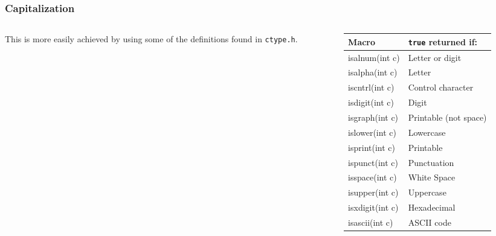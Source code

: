 \begin{frame}[fragile]
\frametitle{Capitalization}
\begin{columns}[T]
\begin{column}{0.45\textwidth}



{\footnotesize
This is more easily achieved by using some of
the definitions found in {\tt ctype.h}.
}
\end{column}


\pause
\begin{column}{0.45\textwidth}
\begin{center}
\begin{tabular}{|l|l|} \hline
Macro        & {\tt true} returned if: \\ \hline
isalnum(int c) & Letter or digit \\
isalpha(int c) & Letter \\
iscntrl(int c) & Control character \\
isdigit(int c) & Digit \\
isgraph(int c) & Printable (not space) \\
islower(int c) & Lowercase\\
isprint(int c) & Printable\\
ispunct(int c) & Punctuation\\
isspace(int c) & White Space\\
isupper(int c) & Uppercase\\
isxdigit(int c)& Hexadecimal\\
isascii(int c) & ASCII code \\ \hline
\end{tabular}
\end{center}
\end{column}

\end{columns}
\end{frame}



